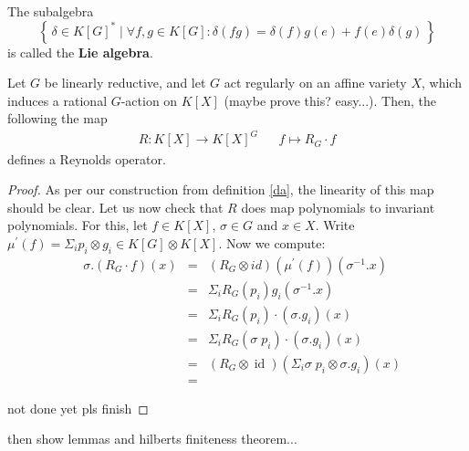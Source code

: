 \begin{remark}
  The subalgebra
  \begin{equation}
    \left\{\, \delta \in K[G]^\ast \mid \forall f,g \in K[G] : \delta (fg) = \delta (f) g(e) + f(e)\delta (g) \,\right\}
  \end{equation}
  is called the \textbf{Lie algebra}.
\end{remark}

\begin{proposition}
  Let $G$ be linearly reductive, and let $G$ act regularly on an affine variety $X$, which induces a rational $G$-action on $K[X]$ (maybe prove this? easy...).
  Then, the following the map
  \begin{align}
    R \colon K[X] \longrightarrow K[X]^G && f \mapsto R_G \cdot f
  \end{align}
  defines a Reynolds operator.
\end{proposition}

\begin{proof}
  As per our construction from definition \ref{da}, the linearity of this map should be clear.
  Let us now check that $R$ does map polynomials to invariant polynomials.
  For this, let $f \in K[X]$, $\sigma \in G$ and $x \in X$.
  Write $\mu^\prime (f) = \Sigma_i p_i \otimes g_i \in K[G] \otimes K[X] $.
  Now we compute:
  \begin{equation}
    \begin{aligned}
      &\sigma . \left( R_G \cdot f \right) (x)
      &=& \left( R_G \otimes id \right) \left( \mu^\prime(f) \right) \left( \sigma^{-1}.x \right) \\
      &&=& \Sigma_i R_G \left( p_i \right)  g_i \left( \sigma^{-1} . x \right) \\
      &&=& \Sigma_i R_G (p_i) \cdot (\sigma . g_i) (x)\\
      &&=& \Sigma_i R_G (\sigma \dot{\phantom{.}} p_i) \cdot (\sigma.g_i) (x)\\
      &&=&(R_G \otimes \operatorname{id}) \left( \Sigma_i \sigma \dot{\phantom{.}} p_i \otimes \sigma.g_i \right) (x) \\ 
      &&=& 
    \end{aligned}
\end{equation}

  not done yet pls finish
\end{proof}

then show lemmas and hilberts finiteness theorem...


